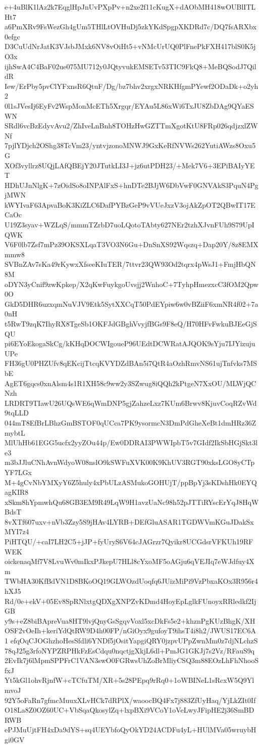 e+4uBlK1lAz2k7EqglHpJnUvPXpPv+n2xe2f11cKugX+dAObMH418wOUBlITLHt7
a6PmXRv9FsWezGh4gUm5THlLtOVHuDj5zkYKdSpgpXKDRd7c/DQ7fsARXbx0efgc
D3CuUdNrJatK3VJsbJMxk6NV8vOiHt5+vNMcUrUQ0PlFnePkFXH417blS0K5jO3x
ijhSwA4C4BaF02ue075MU712y0JQtyvukEMSETv53TIC9FkQ8+MeBQSodJ7QildR
Iew/ErPby5pvClYFxnsR6QtuF/Dg/bz7bhv2xrgxNRKHfgmPYewf2ODaDk+o2yh2
0l1sJVesIj6EyFv2WspMonMcETh5Xrgqr/EYAu5L86xWi6TxJU8ZbDAg9QYaESWN
SRdl6vcBzEdyvAvu2/ZhIveLnBnh8TOHzHwGZTTmXgotKtU8FRp026qdjzxlZWNf
7pjlYDjch2OShg38TcVm23/yntvjzonoMNWJ9GxKeRfNVWs262YutiAWzs8Oxu5G
XOf3vyllrz8UQjLAfQBEjY20JTutkLI3J+jz6utPDH23/+Mek7V6+3EPiBAIyYET
HDhUJnNlgK+7zOidSo8oINPAlFxS+hnDTe2BJjW6DbVwF0GNVAkS3PquN4PgjMWN
kWYIvaF63ApvaBoK3KiZLC6DafPYBzGeP9vVUeJxzV3ojAkZpOT2QBwIT17ECaOc
U19Z3syav+WZLqS/mmmTZrbD7uoLQotoTAbty627NEr2tzhXJvnFUh9S79UpIQWK
V6F0lb7Zsf7mPz39OKSXLqaT3VO3N6Gu+DnSnXS92Wqszq+Dap20Y/8z8EMXmmw8
SVBnZAv7sKa49rKywxXfseeKIuTER/7ttvr23QW93Od2tqrx4pWsJ1+FmjHbQN8M
oDYN3yCnif9zwKpkep/X2qKwFuykgoUvsjj2WnhoC+7TyhpHmezxcC3fOM2Qpw0O
GkD5DHR6uzxqmNuVJV9Etk5SytXXCqT50PdEYpiw6w0vBZiiF6xmNR4f02+7a0nH
t5RwT9zqK7IhyRX8TgeSb1OKFJdGBghVvyjfBGs9F8eQ/H70HFvFwkuBJEeGjSQU
pi6EYoEkogaSkCg/kKHqDOCWIgoueP96UEdtDCWRatAJQOK9sYju7IJYizujuUPe
FH36gU0PHZUfv8qEKcijTtcqKVYDZdBAn5i7QtR4aOzhRmvNS61ujTnfvks7MSbE
AgET6gqcs0xnAlsm4s1R1XH58c9ww2y3SZwug8iQQh2kPtgeN7XxOU/MLWjQCNzh
LRDRT9TIawU26UQsWE6qWmDNP5gjZahzeLxz7KUm6Brwv8KjuvCoqRZvWd9tqLLD
044mT8EfBrLBhzGmBSTOF0qUCca7PK9ysormcN3DmPdGheXeBt1dmHRz36ZmybtL
MlUhHb61EGG5ucfx2yyZOu44p/Ew0DDRAI3PWWIpbT5v7GIdf2IkSbHGjSkt3le3
m3bJJluCNhAvnWdyoW08nslO9kSWFuXVK00K9KhUV3RGT90xksLGO8yCTpYF7LGx
M+4gCvNbYMXyY6Z5huly4xPbULzASMukoGOHUjT/ppBpYj3sKDshHk0EYQagKIR8
xSkm8hYpmwhQu68GB3EM9R49LqW9H1avzUaNc98h52pJTTiRYscErYqJ8HqWBdsT
8vXTf607uxv+nVb3Zzy5S9jHAv4LYRB+DEfGluASAR1TGDWVmKGuJDakSxMYI7z4
PiHTQU/+caI7LH2C5+jJP+fyUryS6V64cJAGrzr7Qyikr8UCGdsrVFKUh19RFWEK
oickenaqMf7V8LvuWv0mIkxPJkepU7HLl8cYxoMF5oAGju6qVEJIq7eWJdfuy4Xm
TWbHA30KfBdVN1D8BKoOQ19GLWOzdUoqfq6JUizMiPi9VzPbxaKOx3R956r4hXJ5
Rd/0e+ekV+05Ev8SpRNlxtgQDXgXNPZvKDmd4HoyEpLglkFUnoyxRRledkf2IjGB
y9s+eZ8biBApreVua8HT9lvjQnyGsSgqvVoxl5xcDkFs5e2+khznPgKUzBhgK/XH
OSF2vOeIh+keriYdQtRW9D4h00FP/nGiOyx9gufoyT9ihsT4i8h2/JWUS17EC6A1
efqOqCJOGhzhoHesSfdli6YNDf5jOsitYapgiQRY0jzpvUPpZwnMm0z7djNLchzS
78qJ25g3rfoNYPZRPHkFzEsCdqu0nqctjgXkjL6dl+PmJG1GKJj7s2Vz/RFauS9q
2EvIk7j6lMpmSPPFrC1VAN3swO0FGRwsUhZoBrMliyCSQ3m88EOzLhFhNhooSfxJ
Yt5kGl1ohvRjnfW+cTCfuTM/XR+5s28PEpq9rRq0+1oWBINeL1sRcxW5Q9YlmvoJ
92Y5oFaRn7gfmcMuuxXLvHCk7dRPlX/waoocBQ4Fx7j883ZfUyHaq/YjLkZIt0If
O18La8Z0OZ60UC+VbSqaQkosylZq+lxpBXi9VCoY1oVeLwyJFipHE2j36SmBDRWB
ePJMuUjtFH4xDa9dYS+sq4UEYbfoQyOkYD24ACDFu4yL+HUlMVa05wruybHgi0GV
